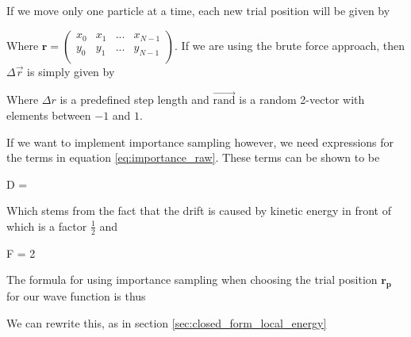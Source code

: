 

If we move only one particle at a time, each new trial position will be given by 

\eqs
{}
\eqf

Where $\mathbf{r} = \left ( \begin{matrix} x_0  & x_1 & ... & x_{N-1} \\ y_0  & y_1 & ... & y_{N-1} \\ \end{matrix}\right ) $. If we are using the brute force approach, then $\Delta \vec r$ is simply given by 

\eqs
{}
\eqf

Where $\Delta r$ is a predefined step length and $\vec {\textrm{rand}}$ is a random 2-vector with elements between $-1$ and $1$. 

If we want to implement importance sampling however, we need expressions for the terms in equation \ref{eq:importance_raw}.
These terms can be shown \cite{slides} to be 

\eqs
D = 
\eqf 

Which stems from the fact that the drift is caused by kinetic energy in front of which is a factor $\frac{1}{2}$ and 

\eqs
F = 2 
\eqf

The formula for using importance sampling when choosing the trial position $\mathbf{r_p}$ for our wave function is thus

\eqs
{}
\eqf

We can rewrite this, as in section \ref{sec:closed_form_local_energy}

